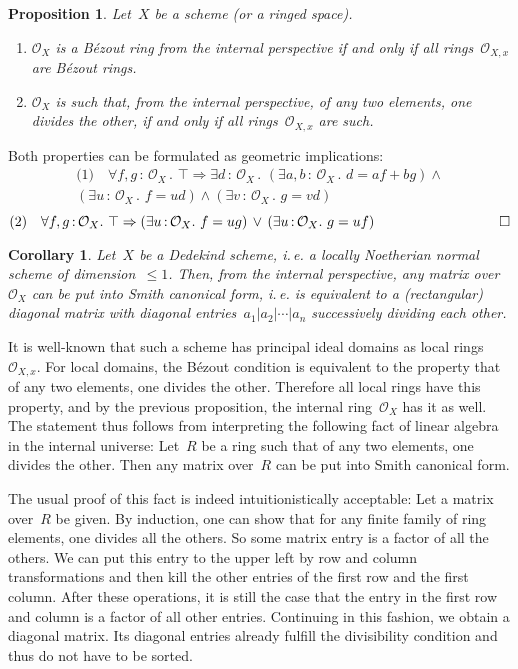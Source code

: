 \documentclass[10pt,reqno,a4paper]{amsbook}
\makeatletter
\theoremstyle{definition}
\theoremstyle{plain}
\newtheorem{prop}[defn]{Proposition}
\newtheorem{cor}[defn]{Corollary}
\theoremstyle{remark}
\renewcommand{\O}{\mathcal{O}}
\newcommand{\?}{\,{:}\,}
\renewcommand{\_}{\mathpunct{.}\,}
\newcommand{\ie}{i.\,e.\@\xspace}
\renewenvironment{proof}[1][\proofname]{\par
  \pushQED{\qed}%
  \normalfont \topsep6\p@\@plus6\p@\relax
  \trivlist
  \item[\hskip\labelsep
        \itshape
    #1\@addpunct{.}]\ignorespaces
}{%
  \popQED\endtrivlist\@endpefalse
}
\makeatother
\begin{document}
\begin{prop}Let~$X$ be a scheme (or a ringed space).
\begin{enumerate}
\item $\O_X$ is a Bézout ring from the internal perspective if and only if all
rings~$\O_{X,x}$ are Bézout rings.
\item $\O_X$ is such that, from the internal perspective, of any two elements,
one divides the other, if and only if all rings~$\O_{X,x}$ are such.
\end{enumerate}
\end{prop}
\begin{proof}Both properties can be formulated as geometric implications:
\begin{multline*}
  \text{(1)}\quad
  \forall f,g\?\O_X\_
  \top \Rightarrow
  \exists d\?\O_X\_
  (\exists a,b\?\O_X\_ d = af + bg) \wedge {} \\
  (\exists u\?\O_X\_ f = ud) \wedge
  (\exists v\?\O_X\_ g = vd)
\end{multline*}
\[
  \text{(2)}\quad
  \forall f,g\?\O_X\_
  \top \Rightarrow
  (\exists u\?\O_X\_ f = ug) \,\vee\,
  (\exists u\?\O_X\_ g = uf) \qquad\qquad\qquad\quad \qedhere
\]
\end{proof}

\begin{cor}\label{cor:dedekind-smith}
Let~$X$ be a Dedekind scheme, \ie a locally Noetherian normal scheme
of dimension~$\leq 1$. Then, from the internal perspective, any matrix
over~$\O_X$ can be put into Smith canonical form, \ie is equivalent to a
(rectangular) diagonal matrix with diagonal entries~$a_1|a_2|\cdots|a_n$
successively dividing each other.
\end{cor}
\begin{proof}It is well-known that such a scheme has principal ideal domains as
local rings~$\O_{X,x}$. For local domains, the Bézout condition is equivalent to the
property that of any two elements, one divides the other. Therefore all local
rings have this property, and by the previous proposition, the internal
ring~$\O_X$ has it as well. The statement thus follows from interpreting the
following fact of linear algebra in the internal universe: Let~$R$ be a ring
such that of any two elements, one divides the other. Then any matrix over~$R$
can be put into Smith canonical form.

The usual proof of this fact is indeed intuitionistically acceptable: Let a
matrix over~$R$ be given. By induction, one can show that for any finite family
of ring elements, one divides all the others. So some matrix entry is a factor
of all the others. We can put this entry to the upper left by row and column
transformations and then kill the other entries of the first row and the first
column. After these operations, it is still the case that the entry in the
first row and column is a factor of all other entries. Continuing in this
fashion, we obtain a diagonal matrix. Its diagonal entries already fulfill
the divisibility condition and thus do not have to be sorted.
\end{proof}
\end{document}
